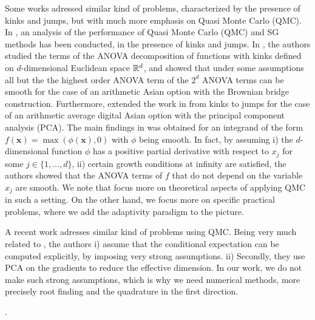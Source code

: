 Some works \cite{griebel2013smoothing,bayersmoothing, griebel2017note,griewank2017high,xiao2018conditional} adressed similar kind of problems, characterized by the presence of kinks and jumps,  but with much more emphasis on Quasi Monte Carlo (QMC). In \cite{griebel2013smoothing, griebel2017note,griewank2017high}, an  analysis of the performance of  Quasi Monte Carlo (QMC) and SG methods has been conducted, in the presence of kinks and jumps.  In \cite{griebel2013smoothing,griebel2017note}, the authors studied the terms of the ANOVA decomposition of functions with kinks defined on $d$-dimensional Euclidean space $\mathbb{R}^d$, and showed   that under some assumptions all but the the highest order ANOVA term  of the $2^d$ ANOVA terms can be smooth for the case of an arithmetic Asian option with the Brownian bridge construction. Furthermore, \cite{griewank2017high} extended the work in \cite{griebel2013smoothing,griebel2017note} from kinks
to jumps for  the case of an arithmetic average digital Asian option with the principal component analysis (PCA). The main findings in \cite{griebel2013smoothing,griebel2017note} was obtained  for an  integrand  of the form $f(\mathbf{x}) = \max(\phi(\mathbf{x}), 0)$ with $\phi$ being smooth. In fact, by assuming  i) the $d$-dimensional function $\phi$ has a positive partial derivative with respect to $x_j$ for some $j \in \{1,\dots,d\}$, ii) certain growth conditions at infinity are satisfied, the authors showed that the ANOVA terms of $f$ that do not depend on the variable $x_j$ are smooth.   We note that \cite{griebel2013smoothing,griebel2017note,griewank2017high} focus  more on  theoretical aspects of applying QMC in such a setting. On the other hand, we focus more on  specific practical problems, where we add the adaptivity paradigm to the picture.

A recent work \cite{xiao2018conditional} adresses similar kind of problems using QMC. Being very much related to \cite{bayersmoothing}, the authors i) assume that the conditional expectation can be computed explicitly, by imposing very strong assumptions. ii) Secondly, they  use  PCA on the gradients to reduce the effective dimension. In our work, we do not make such strong assumptions, which is why we need numerical methods, more precisely root finding and the quadrature in the first direction.

.

